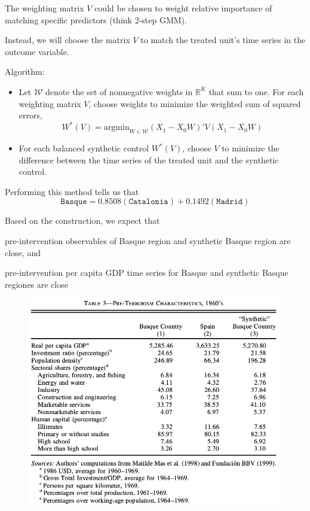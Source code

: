 \documentclass[notes,11pt, aspectratio=169]{beamer}
\newenvironment{wideitemize}{\itemize\addtolength{\itemsep}{10pt}}{\enditemize}
\begin{document}
\begin{frame}{}
        The weighting matrix $V$ could be chosen to weight relative importance of matching
        specific predictors (think 2-step GMM).
        
        \medskip
       
        Instead, we will choose the matrix $V$ to match the treated unit's time series in
        the outcome variable.
        
    \bigskip

    Algorithm:\pause
    \begin{itemize}
    
            \item Let $\mathcal W$ denote the set of nonnegative weights in $\mathbb R^K$ that sum
            to one. For each weighting matrix $V$, 
            choose weights to minimize the weighted sum of squared errors, 
            \[ W^*(V) = \text{argmin}_{W \in \mathcal W} (X_1 - X_0 W)' V (X_1 - X_0 W) \] \pause 
            \item For each balanced synthetic control $W^*(V)$, choose $V$ to minimize the difference
            between the time series of the treated unit and the synthetic control.
            
    \end{itemize}    
    
\end{frame}

\begin{frame}{}
    Performing this method tells us that 
    \[\texttt{Basque} = 0.8508(\texttt{Catalonia}) + 0.1492 (\texttt{Madrid})\]

    \pause Based on the construction, we expect that  \medskip 
    \begin{wideitemize}
        \item pre-intervention observables of Basque region and synthetic Basque region are close, and
        \item pre-intervention per capita GDP time series for Basque and synthetic Basque regiones are close
    \end{wideitemize}
\end{frame}


\begin{frame}{}
    \begin{figure}
        \centering
        \includegraphics[width = .6\textwidth]{figures/balance panel all.png}
        \label{fig:balance_all}
    \end{figure}
\end{frame}
\end{document}
